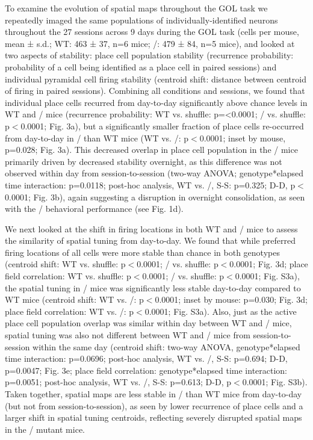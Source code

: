 To examine the evolution of spatial maps throughout the GOL task we repeatedly imaged the same populations of individually-identified neurons throughout the 27 sessions across 9 days during the GOL task (cells per mouse, mean ± s.d.; WT: 463 ± 37, n=6 mice; \df/: 479 ± 84, n=5 mice), and looked at two aspects of stability: place cell population stability (recurrence probability: probability of a cell being identified as a place cell in paired sessions) and individual pyramidal cell firing stability (centroid shift: distance between centroid of firing in paired sessions). Combining all conditions and sessions, we found that individual place cells recurred \citep{Ziv2013} from day-to-day significantly above chance levels in WT and \df/ mice (recurrence probability: WT vs. shuffle: p=<0.0001; \df/ vs. shuffle: p$<$0.0001; Fig. 3a), but a significantly smaller fraction of place cells re-occurred from day-to-day in \df/ than WT mice (WT vs. \df/: p$<$0.0001; inset by mouse, p=0.028; Fig. 3a). This decreased overlap in place cell population in the \df/ mice primarily driven by decreased stability overnight, as this difference was not observed within day from session-to-session (two-way ANOVA; genotype*elapsed time interaction: p=0.0118; post-hoc analysis, WT vs. \df/, S-S: p=0.325; D-D, p$<$0.0001; Fig. 3b), again suggesting a disruption in overnight consolidation, as seen with the \df/ behavioral performance (see Fig. 1d).

We next looked at the shift in firing locations in both WT and \df/ mice to assess the similarity of spatial tuning from day-to-day. We found that while preferred firing locations of all cells were more stable than chance in both genotypes (centroid shift: WT vs. shuffle: p$<$0.0001; \df/ vs. shuffle: p$<$0.0001; Fig. 3d; place field correlation: WT vs. shuffle: p$<$0.0001; \df/ vs. shuffle: p$<$0.0001; Fig. S3a), the spatial tuning in \df/ mice was significantly less stable day-to-day compared to WT mice (centroid shift: WT vs. \df/: p$<$0.0001; inset by mouse: p=0.030; Fig. 3d; place field correlation: WT vs. \df/: p$<$0.0001; Fig. S3a). Also, just as the active place cell population overlap was similar within day between WT and \df/ mice, spatial tuning was also not different between WT and \df/ mice from session-to-session within the same day (centroid shift: two-way ANOVA, genotype*elapsed time interaction: p=0.0696; post-hoc analysis, WT vs. \df/, S-S: p=0.694; D-D, p=0.0047; Fig. 3e; place field correlation: genotype*elapsed time interaction: p=0.0051; post-hoc analysis, WT vs. \df/, S-S: p=0.613; D-D, p$<$0.0001; Fig. S3b). Taken together, spatial maps are less stable in \df/ than WT mice from day-to-day (but not from session-to-session), as seen by lower recurrence of place cells and a larger shift in spatial tuning centroids, reflecting severely disrupted spatial maps in the \df/ mutant mice.

